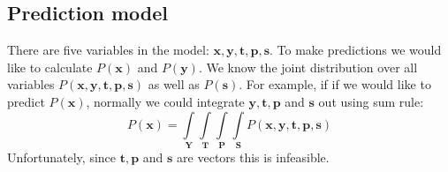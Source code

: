 \documentclass[12pt,a4paper]{book}
\newcommand\bs[1]{\boldsymbol{#1}}
\begin{document}
% 		
% 	
% 		
% 		



\subsection{Prediction model}
There are five variables in the model: $\bs{x},\bs{y},\bs{t},\bs{p},\bs{s}$.
To make predictions we would like to calculate $P(\bs{x})$ and $P(\bs{y})$.
We know the joint distribution over all variables $P(\bs{x},\bs{y},\bs{t},\bs{p},\bs{s})$ as well as $P(\bs{s})$.
For example, if if we would like to predict $P(\bs{x})$, normally we could integrate $\bs{y},\bs{t},\bs{p}$ and $\bs{s}$ out using sum rule:
\begin{equation}
P(\bs{x}) = \int\limits_{\bs{Y}} \int\limits_{\bs{T}} \int\limits_{\bs{P}}\int\limits_{\bs{S}} P(\bs{x},\bs{y},\bs{t},\bs{p},\bs{s})
\end{equation}
Unfortunately, since $\bs{t},\bs{p}$ and $\bs{s}$ are vectors this is infeasible.
\end{document}
